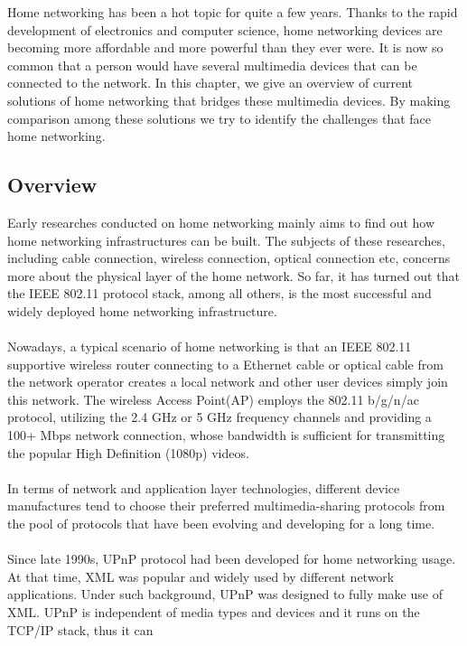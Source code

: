 
Home networking has been a hot topic for quite a few years. Thanks to the rapid development 
of electronics and computer science, home networking devices are becoming more affordable 
and more powerful than they ever were. It is now so common that a person would
have several multimedia devices that can be connected to the network. In this
chapter, we give an overview of current solutions of home networking that
bridges these multimedia devices. By making comparison among these solutions we
try to identify the challenges that face home networking.
\subsection{Overview} 
Early researches \cite{link_layer_old} \cite{end_user} \cite{link_layer}
conducted on home networking mainly aims to find out how home networking
infrastructures can be built. The subjects of these researches, including cable
connection, wireless connection, optical connection etc, concerns more about
the physical layer of the home network.  So far, it has turned out that the
IEEE 802.11 protocol stack, among all others, is the most successful and 
widely deployed home networking infrastructure.\\
\\
Nowadays, a typical scenario of home networking is that an IEEE 802.11
supportive wireless router connecting to a Ethernet cable or optical cable from
the network operator creates a local network and other user devices simply join
this network. The wireless Access Point(AP) employs the 802.11 b/g/n/ac
protocol, utilizing the 2.4 GHz or 5 GHz frequency channels and providing a
100+ Mbps  network connection, whose bandwidth is sufficient for transmitting
the popular High Definition (1080p) videos.\\
\\
In terms of network and application layer technologies, different device 
manufactures tend to choose their preferred multimedia-sharing protocols from
the pool of protocols that have been evolving and developing for a long time.\\
\\
Since late 1990s, UPnP protocol had been developed for home networking usage. 
At that time, XML was popular and widely used by different network applications.
Under such background, UPnP was designed to fully make use of XML. UPnP is 
independent of media types and devices and it runs on the TCP/IP stack, thus it can 
